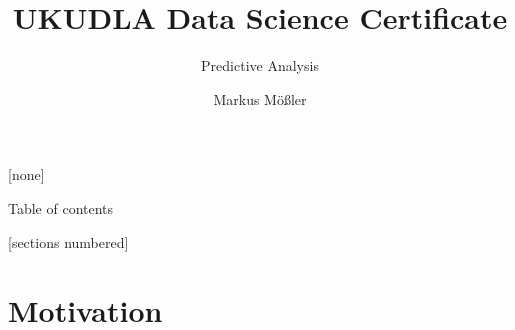 \documentclass[10pt,aspectratio=169]{beamer}
\title{UKUDLA Data Science Certificate}
\subtitle{Predictive Analysis}
\author{Markus Mößler}
\institute{University of Hohenheim}
\begin{document}
\maketitle

{
[none]

\begin{frame}[noframenumbering]{Table of contents}

  \small
  [sections numbered]
  \tableofcontents[hideallsubsections]

\end{frame}
}



\section{Motivation}
\end{document}
